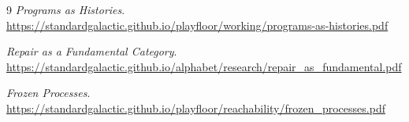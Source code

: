 \documentclass[12pt, oneside]{article}
\begin{document}
\begin{thebibliography}{9}
\smallskip
\noindent\textit{Programs as Histories}.\\
\url{https://standardgalactic.github.io/playfloor/working/programs-as-histories.pdf}

\smallskip
\noindent\textit{Repair as a Fundamental Category}.\\
\url{https://standardgalactic.github.io/alphabet/research/repair_as_fundamental.pdf}

\smallskip
\noindent\textit{Frozen Processes}.\\
\url{https://standardgalactic.github.io/playfloor/reachability/frozen_processes.pdf}

\end{thebibliography}
\end{document}
